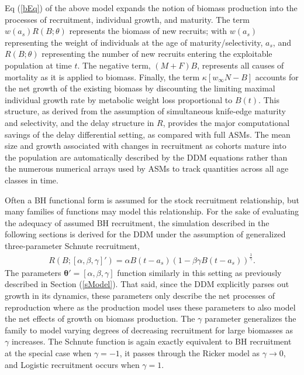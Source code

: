 %
Eq (\ref{bEq}) of the above model expands the notion of biomass production into the
processes of recruitment, individual growth, and maturity. The term $w(a_s)R(B;\theta)$
represents the biomass of new recruits; with $w(a_s)$ representing the weight of individuals
at the age of maturity/selectivity, $a_s$, and $R(B;\theta)$ representing the number of new recruits
entering the exploitable population at time $t$. The negative term, $(M+F)B$, represents all
causes of mortality as it is applied to biomass. Finally, the term $\kappa \left[w_\infty N-B\right]$
accounts for the net growth of the existing biomass by discounting the limiting maximal individual
growth rate by metabolic weight loss proportional to $B(t)$. 
This structure, as derived from the assumption of simultaneous knife-edge maturity and selectivity, and 
the delay structure in $R$, 
provides the major computational savings of the delay differential setting, as
compared with full ASMs. The mean size and growth associated with changes in recruitment as cohorts 
mature into the population are automatically described by the DDM equations rather than the 
numerous numerical arrays used by ASMs to track quantities across all age classes in time.

%
Often a BH functional form is assumed for the stock recruitment relationship, but many %
families of functions may model this relationship. For the sake of evaluating the adequacy
of assumed BH recruitment, the simulation described in the following sections is derived for the 
DDM under the assumption of generalized three-parameter Schnute recruitment,
%
\begin{align}
R(B;[\alpha, \beta, \gamma]') = \alpha B(t-a_s)(1-\beta\gamma B(t-a_s))^{\frac{1}{\gamma}}. \label{srr}
\end{align}
%
The parameters $\bm{\theta}'=[\alpha, \beta, \gamma]$ %
function similarly in this setting as previously described in Section (\ref{sModel}).
That said, since the DDM explicitly parses out growth in its dynamics,
these parameters only describe the net processes of reproduction %
where as the production model uses these parameters to also model the net 
effects of growth on biomass production. %
The $\gamma$ parameter generalizes the family to model varying degrees of
decreasing recruitment for large biomasses as $\gamma$ increases. The Schnute
function is again exactly equivalent to BH recruitment at the special case when
$\gamma=-1$, it passes through the Ricker model as $\gamma\rightarrow0$, and
Logistic recruitment occurs when $\gamma=1$.

